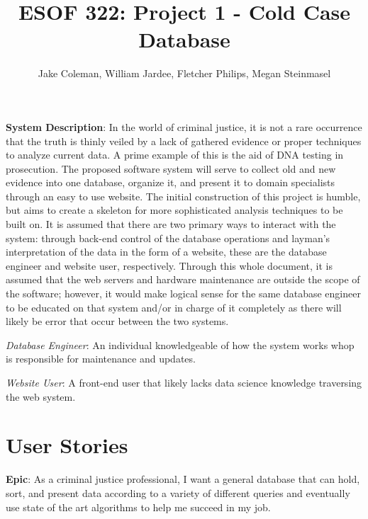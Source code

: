\documentclass[11pt]{article}
\begin{document}
\title{ESOF 322: Project 1 - Cold Case Database}
\author{Jake Coleman, William Jardee, Fletcher Philips, Megan Steinmasel}
\maketitle



\textbf{System Description}: In the world of criminal justice, it is not a rare occurrence that the truth is thinly veiled by a lack of gathered evidence or proper techniques to analyze current data. A prime example of this is the aid of DNA testing in prosecution. The proposed software system will serve to collect old and new evidence into one database, organize it, and present it to domain specialists through an easy to use website. The initial construction of this project is humble, but aims to create a skeleton for more sophisticated analysis techniques to be built on. It is assumed that there are two primary ways to interact with the system: through back-end control of the database operations and layman's interpretation of the data in the form of a website, these are the database engineer and website user, respectively. Through this whole document, it is assumed that the web servers and hardware maintenance are outside the scope of the software; however, it would make logical sense for the same database engineer to be educated on that system and/or in charge of it completely as there will likely be error that occur between the two systems. \vspace{1.5em}

\textit{Database Engineer}: An individual knowledgeable of how the system works whop is responsible for maintenance and updates.\vspace{0.5em}

\textit{Website  User}: A front-end user that likely lacks data science knowledge traversing the web system.\vspace{1.5em}


\section*{User Stories}

\noindent\textbf{Epic}: As a criminal justice professional, I want a general database that can hold, sort, and present data according to a variety of different queries and eventually use state of the art algorithms to help me succeed in my job.\vspace{0.5em}
\end{document}
